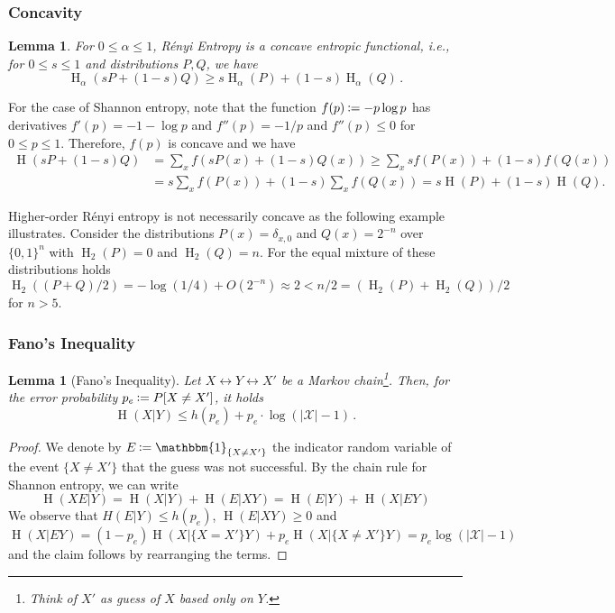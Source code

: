 \documentclass[final,11pt,a4paper]{report}
\newtheorem{lemma}[theorem]{Lemma}
\newcommand*{\assign}{\ensuremath{\kern.5ex\raisebox{.1ex}{\mbox{\rm:}}\kern -.3em =}}
\renewcommand*{\id}{\mathbbm{1}}   %
\newcommand*{\cX}{\mathcal{X}}
\newcommand*{\set}[1]{\{#1\}}          %
\renewcommand*{\H}{\operatorname{H}}   %
\begin{document}
\subsubsection{Concavity}
\begin{lemma} \label{lem:concavity}
  For $0 \leq \alpha \leq 1$, R\'enyi Entropy is a \emph{concave
    entropic functional}, i.e., for $0 \leq s \leq 1$ and
  distributions $P,Q$, we have
\[ \H_\alpha(sP+(1-s)Q) \geq s
  \H_\alpha(P) + (1-s) \H_\alpha(Q) \, . \]
\end{lemma}
For the case of Shannon entropy, note that the function $f(p)\assign
-p \log{p}$ has derivatives $f'(p)=-1-\log p$ and $f''(p)=-1/p$ and
$f''(p) \leq 0$ for $0\leq p \leq 1$. Therefore, $f(p)$ is concave and
we have 
\begin{align*}
\H(sP+(1-s)Q) &= \sum_x f(sP(x)+(1-s)Q(x)) \geq \sum_x
sf(P(x)) + (1-s)f(Q(x))\\ 
&= s \sum_x f(P(x)) + (1-s) \sum_x f(Q(x)) = s \H(P) + (1-s) \H(Q).
\end{align*}

Higher-order R\'enyi entropy is not necessarily concave as the
following example illustrates. Consider the distributions
$P(x)=\delta_{x,0}$ and $Q(x)=2^{-n}$ over $\set{0,1}^n$ with
$\H_2(P)=0$ and $\H_2(Q)=n$. For the equal mixture of these
distributions holds $\H_2((P+Q)/2) = -\log(1/4)+O(2^{-n}) \approx 2 <
n/2 = (\H_2(P)+\H_2(Q))/2$ for $n>5$.

\subsubsection{Fano's Inequality}
\begin{lemma}[Fano's Inequality] \label{lem:fano}
Let $X \!\leftrightarrow\! Y \!\leftrightarrow\! X'$ be a Markov
chain\footnote{Think of $X'$ as guess of $X$ based only on
  $Y$.}. Then, for the error probability $p_e \assign P[X \neq X']$,
it holds
\[ \H(X|Y) \leq h(p_e) + p_e \cdot \log(|\cX|-1) \, .
\]
\end{lemma}
\begin{proof}
We denote by $E \assign \id_{\set{X \neq X'}}$ the indicator random
variable  of the event $\set{X \neq X'}$ that the guess was not successful. By
the chain rule for Shannon entropy, we can write
\[ \H(XE|Y) = \H(X|Y)+\H(E|XY) = \H(E|Y) + \H(X|EY) \]
We observe that $H(E|Y) \leq h(p_e)$, $\H(E|XY)\geq 0$ and 
\[ \H(X|EY) = (1-p_e) \H(X| \set{X=X'} Y) + p_e \H(X|\set{X \neq X'} Y) = p_e
\log(|\cX|-1) \]
and the claim follows by rearranging the terms.
\end{proof}
\end{document}
